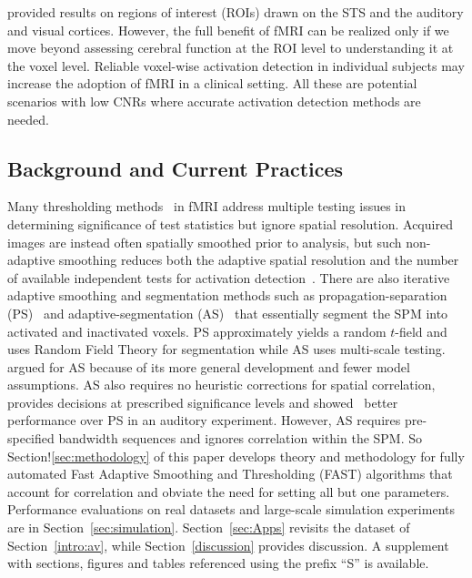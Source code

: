 \citet{nathandbeauchamp11} provided results on regions of interest
(ROIs) drawn on the STS and the 
auditory and visual cortices. However, the full benefit of  fMRI can
be realized only if we move beyond assessing
cerebral function at the ROI level to understanding it at the voxel
level.  Reliable voxel-wise activation detection in individual
subjects may increase the adoption 
of fMRI in a  clinical setting. All these are potential scenarios with
low CNRs where accurate activation detection methods are needed.

\subsection{Background and Current Practices}
\label{background}
Many thresholding
methods~\citep{helleretal06,benjaminiandheller07,smithandfahrmeir07,smithandnichols09,wooetal14}
in fMRI address multiple testing issues in determining significance of 
test statistics but  ignore spatial resolution.
Acquired images are instead often spatially smoothed prior to
analysis, but such  non-adaptive smoothing reduces both the adaptive spatial 
resolution and the number of 
available independent tests for activation
detection~\citep{tabelowetal06}. There are also iterative adaptive 
smoothing and segmentation methods such as 
propagation-separation (PS)~\citep{tabelowetal06} and
adaptive-segmentation (AS)~\citep{polzehletal10} that essentially 
segment the SPM into  activated and inactivated voxels. PS
approximately yields a random $t$-field and uses Random Field Theory
for segmentation while  AS uses multi-scale
testing. \citep{polzehletal10} argued for AS because of its more general 
development and fewer model assumptions. AS also requires no heuristic
corrections for spatial correlation, provides decisions at 
prescribed significance levels and showed~\citep{polzehletal10} better
performance over PS in an auditory experiment. However, 
AS requires pre-specified bandwidth sequences and ignores correlation
within the SPM. So Section!\ref{sec:methodology} of this paper
develops theory and methodology for fully automated Fast Adaptive 
Smoothing and Thresholding (FAST) algorithms that account for correlation and
obviate the need for setting all but one parameters. Performance 
evaluations on real datasets and large-scale 
simulation experiments are in Section~\ref{sec:simulation}. %
Section~\ref{sec:Apps} revisits  the dataset of 
Section~\ref{intro:av}, while Section~\ref{discussion} provides
discussion. 
A supplement with sections, figures and tables referenced
using  the prefix ``S'' is available. %
